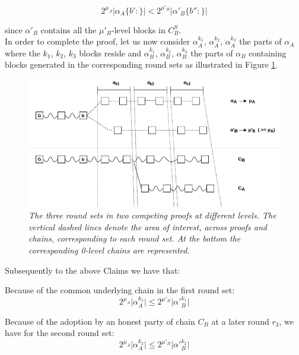 \begin{equation}
2^{\mu_A} \vert \alpha_A\{b':\} \vert < 2^{\mu'_B} \vert \alpha'_B\{b'':\} \vert
\end{equation} 

since $\alpha'_B$ contains all the $\mu'_B$-level blocks in $C_B^S$. \\


In order to complete the proof, let us now consider $\alpha_A^{k_1}$, $\alpha_A^{k_2}$, $\alpha_A^{k_3}$ the parts of $\alpha_A$ where the $k_1$, $k_2$, $k_3$ blocks reside and 
$\alpha_B^{k_1}$, $\alpha_B^{k_2}$, $\alpha_B^{k_3}$ the parts of $\alpha_B$ containing blocks generated in the corresponding round sets as illustrated in Figure \ref{fig:claim3}.

\begin{figure}[h]
	\begin{center}
		\includegraphics[scale=0.5]{figures/claim3.png}
	\end{center}
	\caption{\textit{The three round sets in two competing proofs at different levels. The vertical dashed lines denote the area of interest, across proofs and chains, corresponding to each round set. At the bottom the corresponding 0-level chains are represented.}}
	\label{fig:claim3}
\end{figure}

Subsequently to the above Claims we have that:

Because of the common underlying chain in the first round set:
\begin{equation} \label{eq_round_set_1}
2^{\mu_A} \vert \alpha_A^{k_1} \vert \leq 2^{\mu'_B} \vert \alpha'{_B^{k_1}} \vert
\end{equation}

Because of the adoption by an honest party of chain $C_B$ at a later round $r_3$, we have for the second round set:
\begin{equation} \label{eq_round_set_2}
2^{\mu_A} \vert \alpha_A^{k_2} \vert \leq 2^{\mu'_B} \vert \alpha'{_B^{k_2}} \vert
\end{equation}

